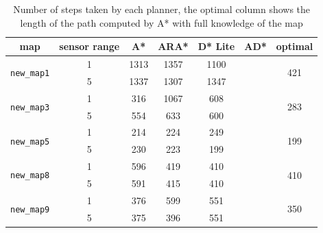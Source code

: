 \documentclass{article}
\begin{document}
\begin{table}[h]
    \centering
    \caption{Number of steps taken by each planner, the optimal column shows the length of the path computed by A* with full knowledge of the map}
    \begin{tabular}{|c|c|c|c|c|c|c|}
        \hline
        map                          & sensor range&A*    &  ARA* & D* Lite & AD* & optimal\\
        \hline
\multirow{2}{*}{\texttt{new\_map1}}  & 1           &1313  &  1357     & 1100    &     & \multirow{2}{*}{421} \\
                                     & 5           &1337  &  1307     & 1347    &     &  \\
        \hline 
\multirow{2}{*}{\texttt{new\_map3}}  & 1           &316   &  1067    & 608     &     & \multirow{2}{*}{283}\\
                                     & 5           &554   &  633     & 600     &     & \\
        \hline 
\multirow{2}{*}{\texttt{new\_map5}}  & 1           &214   &  224     & 249     &     & \multirow{2}{*}{199}\\
                                     & 5           &230   &  223     & 199     &     & \\
        \hline 
\multirow{2}{*}{\texttt{new\_map8}}  & 1           &596   &   419    & 410     &     & \multirow{2}{*}{410}\\
                                     & 5           &591   &   415    & 410     &     & \\
        \hline 
\multirow{2}{*}{\texttt{new\_map9}}  & 1           &376   &   599    & 551     &     & \multirow{2}{*}{350}\\
                                     & 5           &375   &   396    & 551     &     & \\
        \hline
    \end{tabular}
    \label{table:steps}
\end{table}
\end{document}
